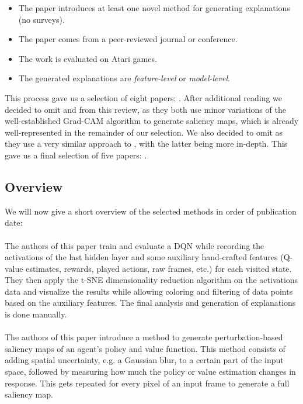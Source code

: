 \documentclass[sigconf]{acmart}
\begin{document}
\begin{itemize}
    \item The paper introduces at least one novel method for generating explanations (no surveys).
    \item The paper comes from a peer-reviewed journal or conference.
    \item The work is evaluated on Atari games.
    \item The generated explanations are \textit{feature-level} or \textit{model-level}.
\end{itemize}

This process gave us a selection of eight papers: \cite{Zahavy2016, Greydanus2018, Huber2019, Nikulin2019, Sieusahai2021, Weitkamp2018, Joo2019, Mott2019}.
After additional reading we decided to omit \cite{Weitkamp2018} and \cite{Joo2019} from this review, as they both use minor variations of the well-established Grad-CAM algorithm\cite{selvaraju2017grad} to generate saliency maps, which is already well-represented in the remainder of our selection.
We also decided to omit \cite{Mott2019} as they use a very similar approach to \cite{Nikulin2019}, with the latter being more in-depth.
This gave us a final selection of five papers: \cite{Zahavy2016, Greydanus2018, Huber2019, Nikulin2019, Sieusahai2021}.

\subsection{Overview}
We will now give a short overview of the selected methods in order of publication date:

\paragraph{\cite{Zahavy2016}} The authors of this paper train and evaluate a DQN while recording the activations of the last hidden layer and some auxiliary hand-crafted features (Q-value estimates, rewards, played actions, raw frames, etc.) for each visited state.
They then apply the t-SNE dimensionality reduction algorithm\cite{van2008visualizing} on the activations data and visualize the results while allowing coloring and filtering of data points based on the auxiliary features.
The final analysis and generation of explanations is done manually.

\paragraph{\cite{Greydanus2018}} The authors of this paper introduce a method to generate perturbation-based saliency maps of an agent's policy and value function.
This method consists of adding spatial uncertainty, e.g. a Gaussian blur, to a certain part of the input space, followed by measuring how much the policy or value estimation changes in response.
This gets repeated for every pixel of an input frame to generate a full saliency map.
\end{document}
